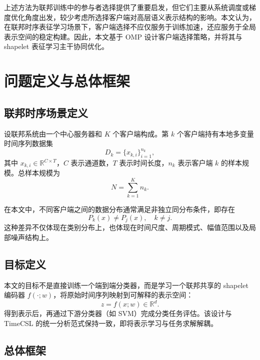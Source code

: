 \documentclass{article}
\begin{document}
上述方法为联邦训练中的参与者选择提供了重要启发，但它们主要从系统调度或梯度优化角度出发，较少考虑所选择客户端对高层语义表示结构的影响。本文认为，在联邦时序表征学习场景下，客户端选择不应仅服务于训练加速，还应服务于全局表示空间的稳定构建。因此，本文基于 OMP 设计客户端选择策略，并将其与 shapelet 表征学习主干协同优化。

\section{问题定义与总体框架}

\subsection{联邦时序场景定义}

设联邦系统由一个中心服务器和 $K$ 个客户端构成。第 $k$ 个客户端持有本地多变量时间序列数据集
\begin{equation}
D_k = \{x_{k,i}\}_{i=1}^{n_k},
\end{equation}
其中 $x_{k,i}\in \mathbb{R}^{C\times T}$，$C$ 表示通道数，$T$ 表示时间长度，$n_k$ 表示客户端 $k$ 的样本规模。总样本规模为
\begin{equation}
N = \sum_{k=1}^{K} n_k.
\end{equation}

在本文中，不同客户端之间的数据分布通常满足非独立同分布条件，即存在
\begin{equation}
P_k(x)\neq P_j(x),\quad k\neq j.
\end{equation}
这种差异不仅体现在类别分布上，也体现在时间尺度、周期模式、幅值范围以及局部噪声结构上。

\subsection{目标定义}

本文的目标不是直接训练一个端到端分类器，而是学习一个联邦共享的 shapelet 编码器 $f(\cdot;w)$，将原始时间序列映射到可解释的表示空间：
\begin{equation}
z = f(x;w)\in \mathbb{R}^{d}.
\end{equation}
得到表示后，再通过下游分类器（如 SVM）完成分类任务评估。该设计与 TimeCSL 的统一分析范式保持一致，即将表示学习与任务求解解耦。

\subsection{总体框架}
\end{document}
